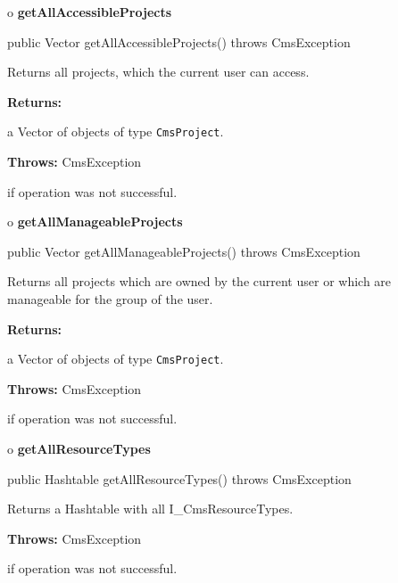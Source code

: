 o {\bf getAllAccessibleProjects} 

\begin{PRE}
 public Vector getAllAccessibleProjects() throws CmsException
\end{PRE}

\begin{description}
\htmlDD Returns all projects, which the current user can access. 

\begin{description}
\item {\bf Returns:}  

a Vector of objects of type {\tt CmsProject}.  
\item {\bf Throws:} CmsException  

if operation was not successful.  
\end{description}

\end{description}

o {\bf getAllManageableProjects} 

\begin{PRE}
 public Vector getAllManageableProjects() throws CmsException
\end{PRE}

\begin{description}
\htmlDD Returns all projects which are owned by the current user or which are
manageable for the group of the user. 

\begin{description}
\item {\bf Returns:}  

a Vector of objects of type {\tt CmsProject}.  
\item {\bf Throws:} CmsException  

if operation was not successful.  
\end{description}

\end{description}

o {\bf getAllResourceTypes} 

\begin{PRE}
 public Hashtable getAllResourceTypes() throws CmsException
\end{PRE}

\begin{description}
\htmlDD Returns a Hashtable with all I\_CmsResourceTypes. 

\begin{description}
\item {\bf Throws:} CmsException  

if operation was not successful.  
\end{description}

\end{description}

